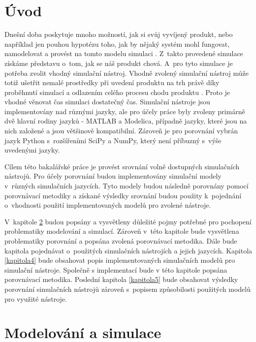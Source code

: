 \chapter{Úvod}

Dnešní doba poskytuje mnoho možností, jak si svůj vyvíjený produkt, nebo například jen pouhou hypotézu toho, jak by nějaký systém mohl fungovat, namodelovat a provést na tomto modelu simulaci \cite{NEGRAO20113051}. Z~takto provedené simulace získáme představu o~tom, jak se náš produkt chová. A~pro tyto simulace je potřeba zvolit vhodný simulační nástroj. Vhodně zvolený simulační nástroj může totiž ušetřit nemalé prostředky při uvedení produktu na trh právě díky proběhnutí simulací a odlazením celého procesu chodu produktu \cite{cohen2010cost}. Proto je vhodné věnovat čas simulaci dostatečný čas. Simulační nástroje jsou implementovány nad různými jazyky, ale pro účely práce byly zvoleny primárně dvě hlavní rodiny jazyků - MATLAB a Modelica, případně jazyky, které jsou na nich založené a jsou většinově kompatibilní. Zároveň je pro porovnání vybrán jazyk Python s~rozšířeními SciPy a NumPy, který není příbuzný s~výše uvedenými jazyky.

Cílem této bakalářské práce je provést srovnání volně dostupných simulačních nástrojů. Pro účely porovnání budou implementovány simulační modely v~různých simulačních jazycích. Tyto modely budou následně porovnány pomocí porovnávací metodiky a získané výsledky srovnání budou použity k~pojednání o~vhodnosti použití implementovaných modelů pro zvolené nástroje.

V~kapitole \ref{kapitola2} budou popsány a vysvětleny důležité pojmy potřebné pro pochopení problematiky modelování a simulací. Zároveň v~této kapitole bude vysvětlena problematiky porovnání a popsána zvolená porovnávací metodika. Dále bude kapitola pojednávat o~použitých simulačních nástrojích a jejich jazycích. Kapitola \ref{kapitola4} bude obsahovat popis implementovaných simulačních modelů pro simulační nástroje. Společně s implementací bude v této kapitole popsána porovnávací metodika. Poslední kapitola \ref{kapitola5} bude obsahovat výsledky porovnání simulačních nástrojů zároveň s~popisem způsobilosti použitých modelů pro využité nástroje.

\chapter{Modelování a simulace}
\label{kapitola2}

